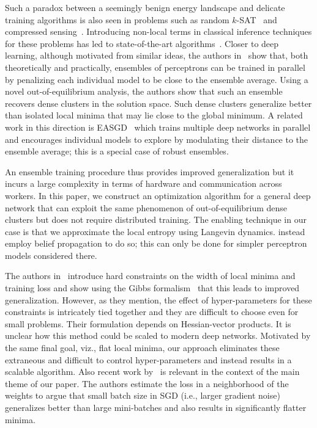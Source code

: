 \documentclass[10pt]{article}
\begin{document}
Such a paradox between a seemingly benign energy landscape and delicate training algorithms is also seen in problems such as random $k$-SAT~\citep{achlioptas2006solution} and compressed sensing~\citep{krzakala2012statistical}. Introducing non-local terms in classical inference techniques for these problems has led to state-of-the-art algorithms~\citep{braunstein2005survey,maneva2007new}. Closer to deep learning, although motivated from similar ideas, the authors in~\citet{baldassi2015subdominant,baldassi2016unreasonable} show that, both theoretically and practically, ensembles of perceptrons can be trained in parallel by penalizing each individual model to be close to the ensemble average. Using a novel out-of-equilibrium analysis, the authors show that such an ensemble recovers dense clusters in the solution space. Such dense clusters generalize better than isolated local minima that may lie close to the global minimum. A related work in this direction is EASGD~\citep{zhang2015deep} which trains multiple deep networks in parallel and encourages individual models to explore by modulating their distance to the ensemble average; this is a special case of robust ensembles.

An ensemble training procedure thus provides improved generalization but it incurs a large complexity in terms of hardware and communication across workers. In this paper, we construct an optimization algorithm for a general deep network that can exploit the same phenomenon of out-of-equilibrium dense clusters but does not require distributed training. The enabling technique in our case is that we approximate the local entropy using Langevin dynamics. \citet{baldassi2016unreasonable} instead employ belief propagation to do so; this can only be done for simpler perceptron models considered there.

The authors in~\citet{hochreiter1997flat} introduce hard constraints on the width of local minima and training loss and show using the Gibbs formalism~\citep{haussler1997mutual} that this leads to improved generalization. However, as they mention, the effect of hyper-parameters for these constraints is intricately tied together and they are difficult to choose even for small problems. Their formulation depends on Hessian-vector products. It is unclear how this method could be scaled to modern deep networks. Motivated by the same final goal, viz., flat local minima, our approach eliminates these extraneous and difficult to control hyper-parameters and instead results in a scalable algorithm. Also recent work by~\citet{keskar2016large} is relevant in the context of the main theme of our paper. The authors estimate the loss in a neighborhood of the weights to argue that small batch size in SGD (i.e., larger gradient noise) generalizes better than large mini-batches and also results in significantly flatter minima.
\end{document}
